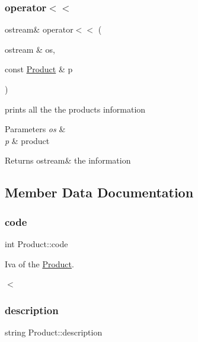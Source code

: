 \subsubsection{\texorpdfstring{operator$<$$<$}{operator<<}}
{\footnotesize\ttfamily ostream\& operator$<$$<$ (\begin{DoxyParamCaption}\item[{ostream \&}]{os,  }\item[{const \hyperlink{classProduct}{Product} \&}]{p }\end{DoxyParamCaption})\hspace{0.3cm}{\ttfamily [friend]}}



prints all the the product\textquotesingle{}s information 


\begin{DoxyParams}{Parameters}
{\em os} & \\
\hline
{\em p} & product \\
\hline
\end{DoxyParams}
\begin{DoxyReturn}{Returns}
ostream\& the information 
\end{DoxyReturn}


\subsection{Member Data Documentation}
\mbox{\label{classProduct_acf4c1bb9d62717e3b2ecaaf7ec5dffd7}} 
\subsubsection{\texorpdfstring{code}{code}}
{\footnotesize\ttfamily int Product\+::code\hspace{0.3cm}{\ttfamily [private]}}



Iva of the \hyperlink{classProduct}{Product}. 

$<$ \mbox{\label{classProduct_ac39d552b24ce60549271a85aea3f5ed0}} 
\subsubsection{\texorpdfstring{description}{description}}
{\footnotesize\ttfamily string Product\+::description\hspace{0.3cm}{\ttfamily [private]}}



